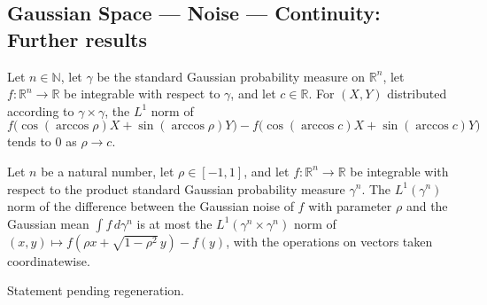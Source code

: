 \subsection*{Gaussian Space --- Noise --- Continuity: Further results}

\begin{lemma}
\label{BooleanAnalysis.GaussianSpace.tendsto_eLpNorm_gaussianEndpoint_at}
\leanok
{}
Let $n\in\mathbb N$, let $\gamma$ be the standard Gaussian probability measure on
$\mathbb R^n$, let $f:\mathbb R^n\to\mathbb R$ be integrable with respect to $\gamma$,
and let $c\in\mathbb R$. For $(X,Y)$ distributed according to $\gamma\times\gamma$, the
$L^1$ norm of
\[
f\bigl(\cos(\arccos\rho)X+\sin(\arccos\rho)Y\bigr)-f\bigl(\cos(\arccos c)X+\sin(\arccos
c)Y\bigr)
\]
tends to $0$ as $\rho\to c$.
\end{lemma}

\begin{lemma}
\label{BooleanAnalysis.GaussianSpace.eLpNorm_gaussianNoise_sub_mean_le}
\leanok
{}
Let $n$ be a natural number, let $\rho\in[-1,1]$, and let $f:\mathbb R^n\to\mathbb R$ be
integrable with respect to the product standard Gaussian probability measure $\gamma^n$.
The $L^1(\gamma^n)$ norm of the difference between the Gaussian noise of $f$ with
parameter $\rho$ and the Gaussian mean $\int f\,d\gamma^n$ is at most the
$L^1(\gamma^n\times\gamma^n)$ norm of $(x,y)\mapsto f(\rho x+\sqrt{1-\rho^2}\,y)-f(y)$,
with the operations on vectors taken coordinatewise.
\end{lemma}

\begin{theorem}
\label{BooleanAnalysis.GaussianSpace.gaussianNoise_tendsto_zero_L1}
\leanok
{}
Statement pending regeneration.
\end{theorem}

